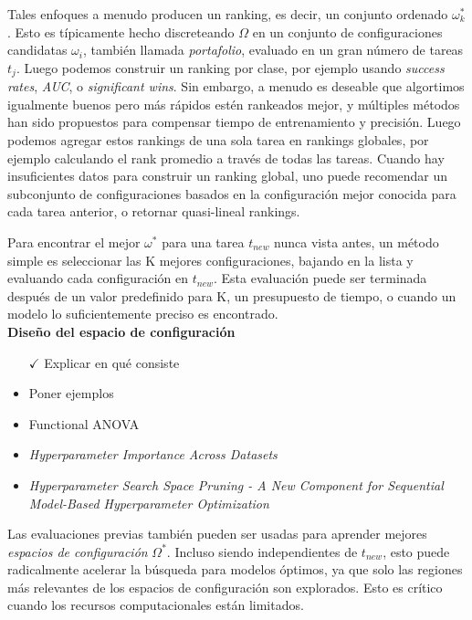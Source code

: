 Tales enfoques a menudo producen un ranking, es decir, un conjunto ordenado $\omega^*_k$. Esto es típicamente hecho discreteando $\Omega$ en un conjunto de configuraciones candidatas $\omega_i$, también llamada \textit{portafolio}, evaluado en un gran número de tareas $t_j$. Luego podemos construir un ranking por clase, por ejemplo usando \textit{success rates}, \textit{AUC}, o \textit{significant wins}. Sin embargo, a menudo es deseable que algortimos igualmente buenos pero más rápidos estén rankeados mejor, y múltiples métodos han sido propuestos para compensar tiempo de entrenamiento y precisión. Luego podemos agregar estos rankings de una sola tarea en rankings globales, por ejemplo calculando el rank promedio a través de todas las tareas. Cuando hay insuficientes datos para construir un ranking global, uno puede recomendar un subconjunto de configuraciones basados en la configuración mejor conocida para cada tarea anterior, o retornar quasi-lineal rankings.

Para encontrar el mejor $\omega^*$ para una tarea $t_{new}$ nunca vista antes, un método simple es seleccionar las K mejores configuraciones, bajando en la lista y evaluando cada configuración en $t_{new}$. Esta evaluación puede ser terminada después de un valor predefinido para K, un presupuesto de tiempo, o cuando un modelo lo suficientemente preciso es encontrado. \\

\textbf{Diseño del espacio de configuración}

\begin{itemize}
	\item[$\checkmark$] Explicar en qué consiste
	\item Poner ejemplos
	\item Functional ANOVA
	\item \textit{Hyperparameter Importance Across Datasets}
	\item \textit{Hyperparameter Search Space Pruning - A New Component for Sequential Model-Based Hyperparameter Optimization}
\end{itemize}


Las evaluaciones previas también pueden ser usadas para aprender mejores \textit{espacios de configuración} $\Omega^*$. Incluso siendo independientes de $t_{new}$, esto puede radicalmente acelerar la búsqueda para modelos óptimos, ya que solo las regiones más relevantes de los espacios de configuración son explorados. Esto es crítico cuando los recursos computacionales están limitados. \\


